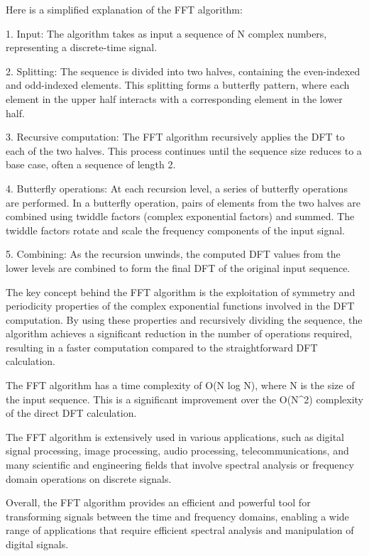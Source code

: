 Here is a simplified explanation of the FFT algorithm:

1. Input: The algorithm takes as input a sequence of N complex numbers, representing a discrete-time signal.

2. Splitting: The sequence is divided into two halves, containing the even-indexed and odd-indexed elements. This splitting forms a butterfly pattern, where each element in the upper half interacts with a corresponding element in the lower half.

3. Recursive computation: The FFT algorithm recursively applies the DFT to each of the two halves. This process continues until the sequence size reduces to a base case, often a sequence of length 2.

4. Butterfly operations: At each recursion level, a series of butterfly operations are performed. In a butterfly operation, pairs of elements from the two halves are combined using twiddle factors (complex exponential factors) and summed. The twiddle factors rotate and scale the frequency components of the input signal.

5. Combining: As the recursion unwinds, the computed DFT values from the lower levels are combined to form the final DFT of the original input sequence.

The key concept behind the FFT algorithm is the exploitation of symmetry and periodicity properties of the complex exponential functions involved in the DFT computation. By using these properties and recursively dividing the sequence, the algorithm achieves a significant reduction in the number of operations required, resulting in a faster computation compared to the straightforward DFT calculation.

The FFT algorithm has a time complexity of O(N log N), where N is the size of the input sequence. This is a significant improvement over the O(N^2) complexity of the direct DFT calculation.

The FFT algorithm is extensively used in various applications, such as digital signal processing, image processing, audio processing, telecommunications, and many scientific and engineering fields that involve spectral analysis or frequency domain operations on discrete signals.

Overall, the FFT algorithm provides an efficient and powerful tool for transforming signals between the time and frequency domains, enabling a wide range of applications that require efficient spectral analysis and manipulation of digital signals.

